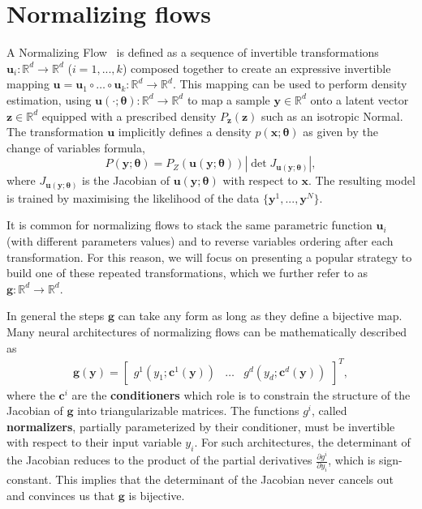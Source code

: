 \section{Normalizing flows}
A Normalizing Flow~\citep[NF, ][]{rezende2015variational} is defined as a sequence of invertible transformations $\mathbf{u}_i : \mathbb{R}^d \to \mathbb{R}^d$  ($i=1, ..., k$) composed together to create an expressive invertible mapping $\mathbf{u} = \mathbf{u}_1 \circ \dots \circ \mathbf{u}_k : \mathbb{R}^d \to \mathbb{R}^d$. This mapping can be used to perform density estimation, using $\mathbf{u}(\cdot ;\mathbf{\theta}): \mathbb{R}^d \rightarrow \mathbb{R}^d$ to map a sample $\mathbf{y} \in \mathbb{R}^d$ onto a latent vector $\mathbf{z} \in \mathbb{R}^d$ equipped with a prescribed density $P_{\mathbf{z}}(\mathbf{z})$ such as an isotropic Normal. The transformation $\mathbf{u}$ implicitly defines a density $p(\mathbf{x}; \mathbf{\theta})$ as given by the change of variables formula,
\begin{equation}
    P(\mathbf{y}; \mathbf{\theta}) = P_Z(\mathbf{u}(\mathbf{y};\mathbf{\theta})) \left| \det  J_{\mathbf{u}(\mathbf{y};\mathbf{\theta})} \right|, \label{eq:NF_DE}
\end{equation}
where $J_{\mathbf{u}(\mathbf{y};\mathbf{\theta})}$ is the Jacobian of $\mathbf{u}(\mathbf{y};\mathbf{\theta})$ with respect to $\mathbf x$.
The resulting model is trained by maximising the likelihood of the data $\{\mathbf{y}^1, ..., \mathbf{y}^N\}$.

It is common for normalizing flows to stack the same parametric function $\mathbf{u}_i$ (with different parameters values) and to reverse variables ordering after each transformation. For this reason, we will focus on presenting a popular strategy to build one of these repeated transformations, which we further refer to as $\mathbf{g}: \mathbb{R}^d\rightarrow \mathbb{R}^d$.

In general the steps $\mathbf{g}$ can take any form as long as they define a bijective map. Many neural architectures of normalizing flows can be mathematically described as
\begin{align}
    \mathbf{g}(\mathbf{y}) = \begin{bmatrix}
g^1(y_{1}; \mathbf{c}^1(\mathbf{y}))  & \hdots & g^d(y_{d}; \mathbf{c}^d(\mathbf{y}))
\end{bmatrix}^T,\label{eq:gnf}
\end{align}
where the $\mathbf{c}^i$ are the \textbf{conditioners} which role is to constrain the structure of the Jacobian of $\mathbf{g}$ into triangularizable matrices. The functions $g^i$, called \textbf{normalizers}, partially parameterized by their conditioner, must be invertible with respect to their input variable $y_i$. For such architectures, the determinant of the Jacobian reduces to the product of the partial derivatives $\frac{\partial g^i}{\partial y_i}$, which is sign-constant. This implies that the determinant of the Jacobian never cancels out and convinces us that $\mathbf{g}$ is bijective.

